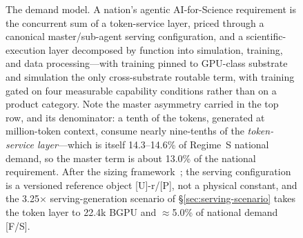 \begin{figure}[htbp]
\caption[The two-layer national AI4S demand model]{The demand model. A nation's agentic AI-for-Science
requirement is the concurrent sum of a token-service layer, priced through a canonical master/sub-agent serving
configuration, and a scientific-execution layer decomposed by function into simulation, training, and data
processing---with training pinned to GPU-class substrate and simulation the only cross-substrate routable
term, with training gated on four measurable capability conditions rather than on a product category. Note the
master asymmetry carried in the top row, and its denominator: a tenth of the tokens, generated at million-token
context, consume nearly nine-tenths of the \emph{token-service layer}---which is itself 14.3--14.6\% of Regime~S
national demand, so the master term is about 13.0\% of the national requirement. After the sizing
framework~\cite{ai4s-framework}; the serving configuration is a versioned reference object [U]-r/[P], not a
physical constant, and the 3.25$\times$ serving-generation scenario of \S\ref{sec:serving-scenario} takes the token
layer to 22.4k BGPU and $\approx$5.0\% of national demand [F/S].}
\label{fig:ai4s-model}
\end{figure}
